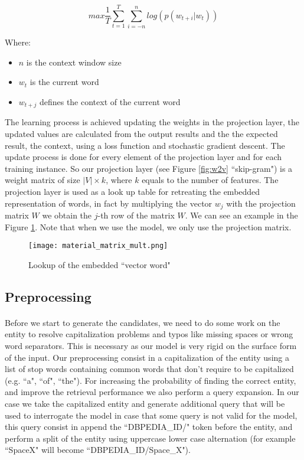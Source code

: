 \begin{equation}
max \frac{1}{T} \sum\limits_{t=1}^{T} \sum\limits_{i=-n}^{n}log(p(w_{t+i} | w_t))
\end{equation}

Where:
\begin{itemize}[noitemsep]
\item \(n\) is the context window size
\item \(w_{t}\) is the current word
\item \(w_{t+j}\) defines the context of the current word
\end{itemize}

The learning process is achieved updating the weights in the projection layer, the updated values are calculated from the output results and the the expected result, the context, using a loss function and stochastic gradient descent. The update process is done for every element of the projection layer and for each training instance. So our projection layer (see Figure \ref{fig:w2v} ``skip-gram") is a weight matrix of size \(|V| \times k\), where \(k\) equals to the number of features. The projection layer is used as a look up table for retreating the embedded representation of words, in fact by multiplying the vector \(w_j\) with the projection matrix \(W\) we obtain the \(j\)-th row of the matrix \(W\). We can see an example in the Figure \ref{fig:projection_layer}. Note that when we use the model, we only use the projection matrix.

\vspace{-10pt}
\begin{figure}[h!]
\texttt{[image: material\_matrix\_mult.png]}
\caption{Lookup of the embedded ``vector word"}
\label{fig:projection_layer}
\end{figure}
\vspace{-10pt}


\subsection{Preprocessing}
\paragraph{} 
Before we start to generate the candidates, we need to do some work on the entity to resolve capitalization problems and typos like missing spaces or wrong word separators. This is necessary as our model is very rigid on  the surface form of the input. Our preprocessing consist in a capitalization of the entity using a list of stop words containing common words that don't require to be capitalized (e.g. ``a", ``of", ``the"). For increasing the probability of finding the correct entity, and improve the retrieval performance we also perform a query expansion. In our case we take the capitalized entity and generate additional query that will be used to interrogate the model in case that some query is not valid for the model, this query consist in append the ``DBPEDIA\_ID/" token before the entity, and perform a split of the entity using uppercase lower case alternation (for example ``SpaceX" will become ``DBPEDIA\_ID/Space\_X"). 

